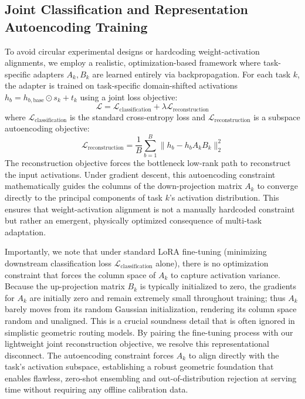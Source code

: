 \subsection{Joint Classification and Representation Autoencoding Training}
\label{subsec:method_overlapping_model}

To avoid circular experimental designs or hardcoding weight-activation alignments, we employ a realistic, optimization-based framework where task-specific adapters $A_k, B_k$ are learned entirely via backpropagation. For each task $k$, the adapter is trained on task-specific domain-shifted activations $h_b = h_{b,\text{base}} \odot s_k + t_k$ using a joint loss objective:
\begin{equation}
    \mathcal{L} = \mathcal{L}_{\text{classification}} + \lambda \mathcal{L}_{\text{reconstruction}}
\end{equation}
where $\mathcal{L}_{\text{classification}}$ is the standard cross-entropy loss and $\mathcal{L}_{\text{reconstruction}}$ is a subspace autoencoding objective:
\begin{equation}
    \mathcal{L}_{\text{reconstruction}} = \frac{1}{B} \sum_{b=1}^B \parallel h_b - h_b A_k B_k \parallel_2^2
\end{equation}
The reconstruction objective forces the bottleneck low-rank path to reconstruct the input activations. Under gradient descent, this autoencoding constraint mathematically guides the columns of the down-projection matrix $A_k$ to converge directly to the principal components of task $k$'s activation distribution. This ensures that weight-activation alignment is not a manually hardcoded constraint but rather an emergent, physically optimized consequence of multi-task adaptation.

Importantly, we note that under standard LoRA fine-tuning (minimizing downstream classification loss $\mathcal{L}_{\text{classification}}$ alone), there is no optimization constraint that forces the column space of $A_k$ to capture activation variance. Because the up-projection matrix $B_k$ is typically initialized to zero, the gradients for $A_k$ are initially zero and remain extremely small throughout training; thus $A_k$ barely moves from its random Gaussian initialization, rendering its column space random and unaligned. This is a crucial soundness detail that is often ignored in simplistic geometric routing models. By pairing the fine-tuning process with our lightweight joint reconstruction objective, we resolve this representational disconnect. The autoencoding constraint forces $A_k$ to align directly with the task's activation subspace, establishing a robust geometric foundation that enables flawless, zero-shot ensembling and out-of-distribution rejection at serving time without requiring any offline calibration data.

